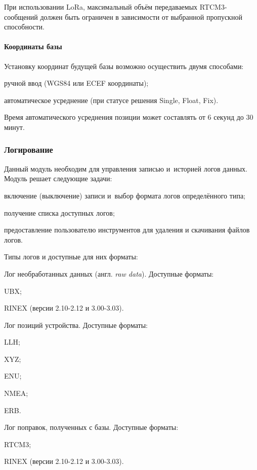 При использовании LoRa, максимальный объём передаваемых RTCM3-сообщений должен быть ограничен в зависимости от выбранной пропускной способности.

\paragraph{Координаты базы}

Установку координат будущей базы возможно осуществить двумя способами:
\begin{dashitemize}
  \item ручной ввод (WGS84 или ECEF координаты);
  \item автоматическое усреднение (при статусе решения Single, Float, Fix).
\end{dashitemize}

Время автоматического усреднения позиции может составлять от 6 секунд до 30 минут.


\subsubsection{Логирование}

Данный модуль необходим для управления записью и~историей логов данных. Модуль решает следующие задачи:
\begin{dashitemize}
  \item включение (выключение) записи и~выбор формата логов определённого типа;
  \item получение списка доступных логов;
  \item предоставление пользователю инструментов для удаления и скачивания файлов логов.
\end{dashitemize}

Типы логов и доступные для них форматы:
\begin{dashitemize}
  \item Лог необработанных данных (англ. \emph{raw data}). Доступные форматы:
  \begin{dashitemize}
    \item UBX;
    \item RINEX (версии 2.10-2.12 и 3.00-3.03).
  \end{dashitemize}
  
  \item Лог позиций устройства. Доступные форматы:
  \begin{dashitemize}
    \item LLH;
    \item XYZ;
    \item ENU;
    \item NMEA;
    \item ERB.
  \end{dashitemize}
  
  \item Лог поправок, полученных с базы. Доступные форматы:
  \begin{dashitemize}
    \item RTCM3;
    \item RINEX (версии 2.10-2.12 и 3.00-3.03).
  \end{dashitemize}
\end{dashitemize}


